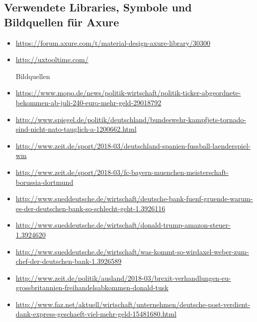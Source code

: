 \subsection{Verwendete Libraries, Symbole und Bildquellen für Axure}


\begin{itemize}
  \sloppy

  Axure Bibliotheken

  \item \url{https://forum.axure.com/t/material-design-axure-library/30300}
  \item \url{http://uxtooltime.com/}

  Bildquellen

  \item \url{https://www.mopo.de/news/politik-wirtschaft/politik-ticker-abgeordnete-bekommen-ab-juli-240-euro-mehr-geld-29018792}
  \item \url{http://www.spiegel.de/politik/deutschland/bundeswehr-kampfjets-tornado-sind-nicht-nato-tauglich-a-1200662.html}
  \item \url{http://www.zeit.de/sport/2018-03/deutschland-spanien-fussball-laenderspiel-wm}
  \item \url{http://www.zeit.de/sport/2018-03/fc-bayern-muenchen-meisterschaft-borussia-dortmund}
  \item \url{http://www.sueddeutsche.de/wirtschaft/deutsche-bank-fuenf-gruende-warum-es-der-deutschen-bank-so-schlecht-geht-1.3926116}
  \item \url{http://www.sueddeutsche.de/wirtschaft/donald-trump-amazon-steuer-1.3924620}
  \item \url{http://www.sueddeutsche.de/wirtschaft/was-kommt-so-wirdaxel-weber-zum-chef-der-deutschen-bank-1.3926589}
  \item \url{http://www.zeit.de/politik/ausland/2018-03/brexit-verhandlungen-eu-grossbritannien-freihandelsabkommen-donald-tusk}
  \item \url{http://www.faz.net/aktuell/wirtschaft/unternehmen/deutsche-post-verdient-dank-express-geschaeft-viel-mehr-geld-15481680.html}
\end{itemize}
